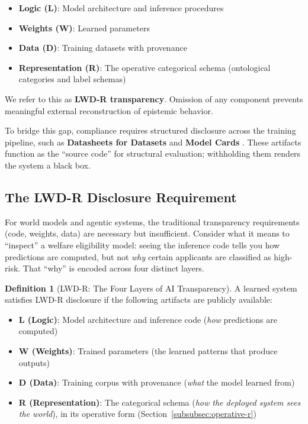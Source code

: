 \documentclass{article}
\theoremstyle{definition}
\newtheorem{definition}{Definition}[section]
\begin{document}
\begin{itemize}[noitemsep]
    \item \textbf{Logic (L)}: Model architecture and inference procedures
    \item \textbf{Weights (W)}: Learned parameters
    \item \textbf{Data (D)}: Training datasets with provenance
    \item \textbf{Representation (R)}: The operative categorical schema (ontological categories and label schemas)
\end{itemize}

We refer to this as \textbf{LWD-R transparency}. Omission of any component prevents meaningful external reconstruction of epistemic behavior.

To bridge this gap, compliance requires structured disclosure across the training pipeline, such as \textbf{Datasheets for Datasets} \citep{gebru2021} and \textbf{Model Cards} \citep{mitchell2019}. These artifacts function as the ``source code'' for structural evaluation; withholding them renders the system a black box.

\subsection{The LWD-R Disclosure Requirement}

For world models and agentic systems, the traditional transparency requirements (code, weights, data) are necessary but insufficient. Consider what it means to ``inspect'' a welfare eligibility model: seeing the inference code tells you how predictions are computed, but not \textit{why} certain applicants are classified as high-risk. That ``why'' is encoded across four distinct layers.

\begin{definition}[LWD-R: The Four Layers of AI Transparency]
\label{def:lwdr}
A learned system satisfies LWD-R disclosure if the following artifacts are publicly available:
\begin{itemize}[noitemsep]
    \item \textbf{L (Logic)}: Model architecture and inference code (\textit{how} predictions are computed)
    \item \textbf{W (Weights)}: Trained parameters (the learned patterns that produce outputs)
    \item \textbf{D (Data)}: Training corpus with provenance (\textit{what} the model learned from)
    \item \textbf{R (Representation)}: The categorical schema (\textit{how the deployed system sees the world}), in its operative form (Section~\ref{subsubsec:operative-r})
\end{itemize}
\end{definition}
\end{document}
